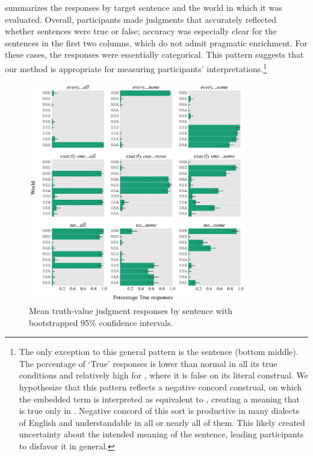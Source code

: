 \documentclass[leqno,12pt]{article}
\begin{document}
 summarizes the responses by target
sentence and the world in which it was evaluated. Overall,
participants made judgments that accurately reflected whether
sentences were true or false; accuracy was especially clear for the
sentences in the first two columns, which do not admit pragmatic
enrichment. For these cases, the responses were essentially
categorical. This pattern suggests that our method is appropriate for
measuring participants' interpretations.\footnote{The only exception
  to this general pattern is the sentence  (bottom middle). The percentage of `True' responses is
  lower than normal in all its true conditions and relatively high for
  , where it is false on its literal construal. We
  hypothesize that this pattern reflects a negative concord construal,
  on which the embedded term is interpreted as equivalent to , creating a meaning that is true only in
  . Negative concord of this sort is productive in many
  dialects of English and understandable in all or nearly all of
  them. This likely created uncertainty about the intended meaning of
  the sentence, leading participants to disfavor it in general.}

\begin{figure}[!ht]
  \centering
  \includegraphics[width=0.85\textwidth]{fig/basketball-binary-version-pilot-4-1-15-results-parsed}
  \caption{Mean truth-value judgment responses by sentence with bootstrapped 95\% confidence intervals.}
  \label{fig:binary:results}
\end{figure}
\end{document}
